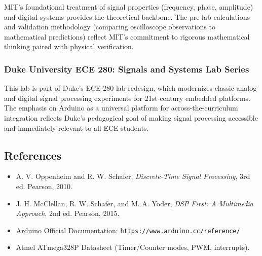 \documentclass[11pt,letterpaper]{article}
\begin{document}
MIT's foundational treatment of signal properties (frequency, phase, amplitude) and digital systems provides the theoretical backbone. The pre-lab calculations and validation methodology (comparing oscilloscope observations to mathematical predictions) reflect MIT's commitment to rigorous mathematical thinking paired with physical verification.

\subsubsection*{Duke University ECE 280: Signals and Systems Lab Series}

This lab is part of Duke's ECE 280 lab redesign, which modernizes classic analog and digital signal processing experiments for 21st-century embedded platforms. The emphasis on Arduino as a universal platform for across-the-curriculum integration reflects Duke's pedagogical goal of making signal processing accessible and immediately relevant to all ECE students.

\subsection*{References}

\begin{itemize}
    \item A. V. Oppenheim and R. W. Schafer, \textit{Discrete-Time Signal Processing}, 3rd ed. Pearson, 2010.
    \item J. H. McClellan, R. W. Schafer, and M. A. Yoder, \textit{DSP First: A Multimedia Approach}, 2nd ed. Pearson, 2015.
    \item Arduino Official Documentation: \texttt{https://www.arduino.cc/reference/}
    \item Atmel ATmega328P Datasheet (Timer/Counter modes, PWM, interrupts).
\end{itemize}
\end{document}
